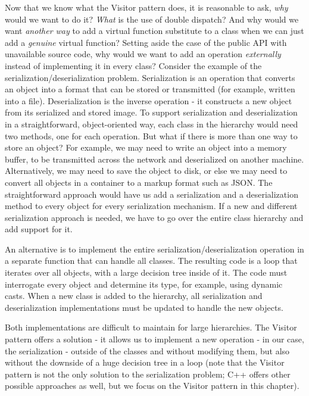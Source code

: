 Now that we know what the Visitor pattern does, it is reasonable to ask, \emph{why} would we want to do it? \emph{What} is the use of double dispatch? And why would we want \emph{another way} to add a virtual function substitute to a class when we can just add a \emph{genuine} virtual function? Setting aside the case of the public API with unavailable source code, why would we want to add an operation \emph{externally} instead of implementing it in every class? Consider the example of the serialization/deserialization problem. Serialization is an operation that converts an object into a format that can be stored or transmitted (for example, written into a file). Deserialization is the inverse operation - it constructs a new object from its serialized and stored image. To support serialization and deserialization in a straightforward, object-oriented way, each class in the hierarchy would need two methods, one for each operation. But what if there is more than one way to store an object? For example, we may need to write an object into a memory buffer, to be transmitted across the network and deserialized on another machine. Alternatively, we may need to save the object to disk, or else we may need to convert all objects in a container to a markup format such as JSON. The straightforward approach would have us add a serialization and a deserialization method to every object for every serialization mechanism. If a new and different serialization approach is needed, we have to go over the entire class hierarchy and add support for it.

An alternative is to implement the entire serialization/deserialization operation in a separate function that can handle all classes. The resulting code is a loop that iterates over all objects, with a large decision tree inside of it. The code must interrogate every object and determine its type, for example, using dynamic casts. When a new class is added to the hierarchy, all serialization and deserialization implementations must be updated to handle the new objects.

Both implementations are difficult to maintain for large hierarchies. The Visitor pattern offers a solution - it allows us to implement a new operation - in our case, the serialization - outside of the classes and without modifying them, but also without the downside of a huge decision tree in a loop (note that the Visitor pattern is not the only solution to the serialization problem; C++ offers other possible approaches as well, but we focus on the Visitor pattern in this chapter).


